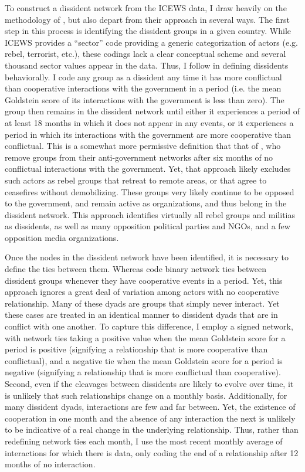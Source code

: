 To construct a dissident network from the ICEWS data, I draw heavily on the methodology of \citet{Metternich2013}, but also depart from their approach in several ways. The first step in this process is identifying the dissident groups in a given country. While ICEWS provides a ``sector'' code providing a generic categorization of actors (e.g. rebel, terrorist, etc.), these codings lack a clear conceptual scheme and several thousand sector values appear in the data. Thus, I follow \citet{Metternich2013} in defining dissidents behaviorally. I code any group as a dissident any time it has more conflictual than cooperative interactions with the government in a period (i.e. the mean Goldstein score of its interactions with the government is less than zero). The group then remains in the dissident network until either it experiences a period of at least 18 months in which it does not appear in any events, or it experiences a period in which its interactions with the government are more cooperative than conflictual. This is a somewhat more permissive definition that that of \citet{Metternich2013}, who remove groups from their anti-government networks after six months of no conflictual interactions with the government. Yet, that approach likely excludes such actors as rebel groups that retreat to remote areas, or that agree to ceasefires without demobilizing. These groups very likely continue to be opposed to the government, and remain active as organizations, and thus belong in the dissident network. This approach identifies virtually all rebel groups and militias as dissidents, as well as many opposition political parties and NGOs, and a few opposition media organizations.

Once the nodes in the dissident network have been identified, it is necessary to define the ties between them. Whereas \citet{Metternich2013} code binary network ties between dissident groups whenever they have cooperative events in a period. Yet, this approach ignores a great deal of variation among actors with no cooperative relationship. Many of these dyads are groups that simply never interact. Yet these cases are treated in an identical manner to dissident dyads that are in conflict with one another. To capture this difference, I employ a signed network, with network ties taking a positive value when the mean Goldstein score for a period is positive (signifying a relationship that is more cooperative than conflictual), and a negative tie when the mean Goldstein score for a period is negative (signifying a relationship that is more conflictual than cooperative). Second, even if the cleavages between dissidents are likely to evolve over time, it is unlikely that such relationships change on a monthly basis. Additionally, for many dissident dyads, interactions are few and far between. Yet, the existence of cooperation in one month and the absence of any interaction the next is unlikely to be indicative of a real change in the underlying relationship. Thus, rather than redefining network ties each month, I use the most recent monthly average of interactions for which there is data, only coding the end of a relationship after 12 months of no interaction.

